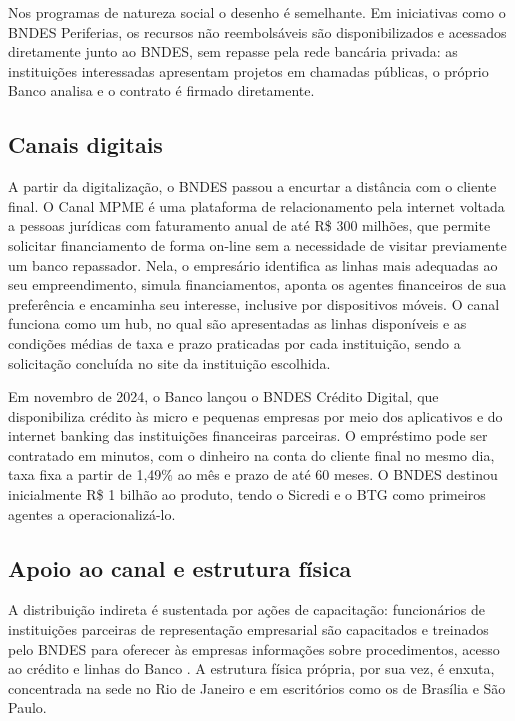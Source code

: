 Nos programas de natureza social o desenho é semelhante. Em iniciativas como o BNDES Periferias, os recursos não reembolsáveis são disponibilizados e acessados diretamente junto ao BNDES, sem repasse pela rede bancária privada: as instituições interessadas apresentam projetos em chamadas públicas, o próprio Banco analisa e o contrato é firmado diretamente.

\subsection{Canais digitais}

A partir da digitalização, o BNDES passou a encurtar a distância com o cliente final. O Canal MPME é uma plataforma de relacionamento pela internet voltada a pessoas jurídicas com faturamento anual de até R\$ 300 milhões, que permite solicitar financiamento de forma on-line sem a necessidade de visitar previamente um banco repassador. Nela, o empresário identifica as linhas mais adequadas ao seu empreendimento, simula financiamentos, aponta os agentes financeiros de sua preferência e encaminha seu interesse, inclusive por dispositivos móveis. O canal funciona como um hub, no qual são apresentadas as linhas disponíveis e as condições médias de taxa e prazo praticadas por cada instituição, sendo a solicitação concluída no site da instituição escolhida.

Em novembro de 2024, o Banco lançou o BNDES Crédito Digital, que disponibiliza crédito às micro e pequenas empresas por meio dos aplicativos e do internet banking das instituições financeiras parceiras. O empréstimo pode ser contratado em minutos, com o dinheiro na conta do cliente final no mesmo dia, taxa fixa a partir de 1,49\% ao mês e prazo de até 60 meses. O BNDES destinou inicialmente R\$ 1 bilhão ao produto, tendo o Sicredi e o BTG como primeiros agentes a operacionalizá-lo.

\subsection{Apoio ao canal e estrutura física}

A distribuição indireta é sustentada por ações de capacitação: funcionários de instituições parceiras de representação empresarial são capacitados e treinados pelo BNDES para oferecer às empresas informações sobre procedimentos, acesso ao crédito e linhas do Banco \cite{bndes_atendimento_parceiras_2026}. A estrutura física própria, por sua vez, é enxuta, concentrada na sede no Rio de Janeiro e em escritórios como os de Brasília e São Paulo.

